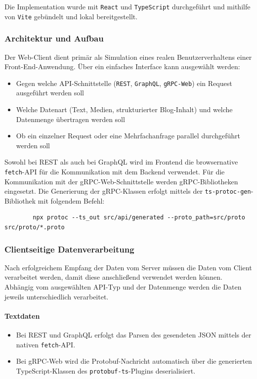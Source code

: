 \begin{enumerate}
	 Die Implementation wurde mit \texttt{React} und \texttt{TypeScript} durchgeführt und mithilfe von \texttt{Vite} gebündelt und lokal bereitgestellt.
	
	\subsubsection*{Architektur und Aufbau}
	Der Web-Client dient primär als Simulation eines realen Benutzerverhaltens einer Front-End-Anwendung. Über ein einfaches Interface kann ausgewählt werden:
	\begin{itemize}
		\item Gegen welche API-Schnittstelle (\texttt{REST}, \texttt{GraphQL}, \texttt{gRPC-Web}) ein Request ausgeführt werden soll
		\item Welche Datenart (Text, Medien, strukturierter Blog-Inhalt) und welche Datenmenge übertragen werden soll
		\item Ob ein einzelner Request oder eine Mehrfachanfrage parallel durchgeführt werden soll
	\end{itemize}
	
	Sowohl bei REST als auch bei GraphQL wird im Frontend die browsernative \texttt{fetch}-API für die Kommunikation mit dem Backend verwendet.  
	Für die Kommunikation mit der gRPC-Web-Schnittstelle werden gRPC-Bibliotheken eingesetzt. Die Generierung der gRPC-Klassen erfolgt mittels der \texttt{ts-protoc-gen}-Bibliothek mit folgendem Befehl:
	
	\begin{verbatim}
		npx protoc --ts_out src/api/generated --proto_path=src/proto src/proto/*.proto
	\end{verbatim}
	
	\subsubsection*{Clientseitige Datenverarbeitung}
	Nach erfolgreichem Empfang der Daten vom Server müssen die Daten vom Client verarbeitet werden, damit diese anschließend verwendet werden können. Abhängig vom ausgewählten API-Typ und der Datenmenge werden die Daten jeweils unterschiedlich verarbeitet. 
	
	\paragraph{Textdaten}
	\begin{itemize}
		\item Bei REST und GraphQL erfolgt das Parsen des gesendeten JSON mittels der nativen \texttt{fetch}-API.
		\item Bei gRPC-Web wird die Protobuf-Nachricht automatisch über die generierten TypeScript-Klassen des \texttt{protobuf-ts}-Plugins deserialisiert.
	\end{itemize}
	

\end{enumerate}

